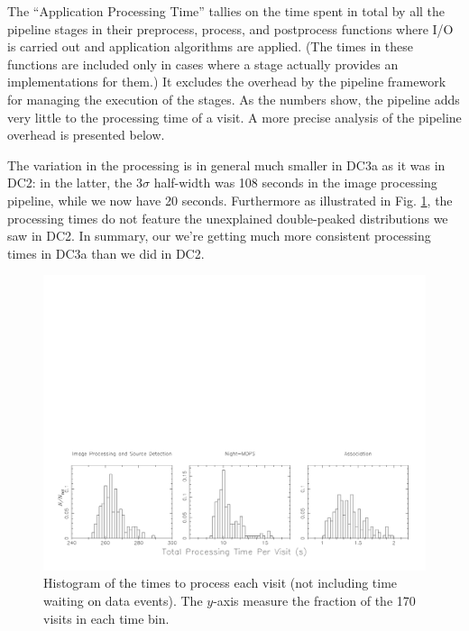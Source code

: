 The ``Application Processing Time'' tallies on the time spent in total
by all the pipeline stages in their preprocess, process, and
postprocess functions where I/O is carried out and application
algorithms are applied.  (The times in these functions are included
only in cases where a stage actually provides an implementations for
them.)  It excludes the overhead by the pipeline framework for
managing the execution of the stages.  As the numbers show, the
pipeline adds very little to the processing time of a visit.  A more
precise analysis of the pipeline overhead is presented below.  

The variation in the processing is in general much smaller in DC3a as
it was in DC2: in the latter, the $3\sigma$ half-width was 108
seconds in the image processing pipeline, while we now have 20
seconds.  Furthermore as illustrated in Fig. \ref{fig:visitdist}, the
processing times do not feature the unexplained double-peaked
distributions we saw in DC2.  In summary, our we're getting much more
consistent processing times in DC3a than we did in DC2.  

\begin{figure}[htbp]
\begin{center}
\includegraphics[width=\textwidth,viewport=25 25 775 250,clip]{images/visitdist.pdf}
\caption{Histogram of the times to process each visit (not including
  time waiting on data events).  The $y$-axis measure the fraction of
  the 170 visits in each time bin.  
\label{fig:visitdist}}
\end{center}
\end{figure}

